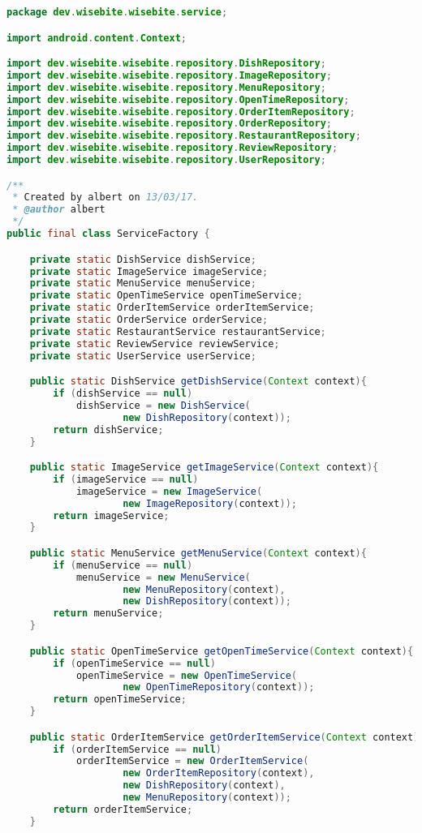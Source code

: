 \begin{lstlisting}[language=java,firstnumber=1]
package dev.wisebite.wisebite.service;

import android.content.Context;

import dev.wisebite.wisebite.repository.DishRepository;
import dev.wisebite.wisebite.repository.ImageRepository;
import dev.wisebite.wisebite.repository.MenuRepository;
import dev.wisebite.wisebite.repository.OpenTimeRepository;
import dev.wisebite.wisebite.repository.OrderItemRepository;
import dev.wisebite.wisebite.repository.OrderRepository;
import dev.wisebite.wisebite.repository.RestaurantRepository;
import dev.wisebite.wisebite.repository.ReviewRepository;
import dev.wisebite.wisebite.repository.UserRepository;

/**
 * Created by albert on 13/03/17.
 * @author albert
 */
public final class ServiceFactory {

    private static DishService dishService;
    private static ImageService imageService;
    private static MenuService menuService;
    private static OpenTimeService openTimeService;
    private static OrderItemService orderItemService;
    private static OrderService orderService;
    private static RestaurantService restaurantService;
    private static ReviewService reviewService;
    private static UserService userService;

    public static DishService getDishService(Context context){
        if (dishService == null)
            dishService = new DishService(
                    new DishRepository(context));
        return dishService;
    }

    public static ImageService getImageService(Context context){
        if (imageService == null)
            imageService = new ImageService(
                    new ImageRepository(context));
        return imageService;
    }

    public static MenuService getMenuService(Context context){
        if (menuService == null)
            menuService = new MenuService(
                    new MenuRepository(context),
                    new DishRepository(context));
        return menuService;
    }

    public static OpenTimeService getOpenTimeService(Context context){
        if (openTimeService == null)
            openTimeService = new OpenTimeService(
                    new OpenTimeRepository(context));
        return openTimeService;
    }

    public static OrderItemService getOrderItemService(Context context){
        if (orderItemService == null)
            orderItemService = new OrderItemService(
                    new OrderItemRepository(context),
                    new DishRepository(context),
                    new MenuRepository(context));
        return orderItemService;
    }


\end{lstlisting}
